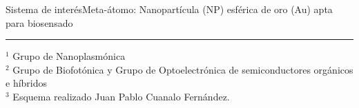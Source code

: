 \begin{frame}{Sistema de interés}{Meta-átomo: Nanopartícula (NP) esférica de oro (Au) apta para biosensado}
\begin{center}
    \end{center}

    \vspace*{-3.5em}
        \noindent\rule{.25\textwidth}{0.4pt}
         \begin{spacing}{0}\fontsize{4}{12} \selectfont
            $^1$ Grupo de Nanoplasmónica\\
            $^2$ Grupo de Biofotónica y Grupo de Optoelectrónica de semiconductores orgánicos e híbridos\\
            $^3$ Esquema realizado Juan Pablo Cuanalo Fernández.
         \end{spacing}
\end{frame}
